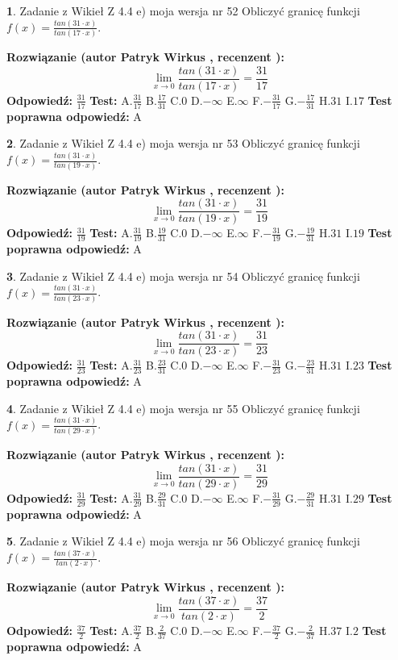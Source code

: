 \documentclass[12pt, a4paper]{article}
\theoremstyle{definition} %
\newtheorem{zad}{}
\newcommand{\zadStart}[1]{\begin{zad}#1\newline}
\newcommand{\zadStop}{\end{zad}}
\newcommand{\rozwStart}[2]{\noindent \textbf{Rozwiązanie (autor #1 , recenzent #2): }\newline}
\newcommand{\rozwStop}{\newline}
\newcommand{\odpStart}{\noindent \textbf{Odpowiedź:}\newline}
\newcommand{\odpStop}{\newline}
\newcommand{\testStart}{\noindent \textbf{Test:}\newline}
\newcommand{\testStop}{\newline}
\newcommand{\kluczStart}{\noindent \textbf{Test poprawna odpowiedź:}\newline}
\newcommand{\kluczStop}{\newline}
\begin{document}
\zadStart{Zadanie z Wikieł Z 4.4 e) moja wersja nr 52}
Obliczyć granicę funkcji $f(x)=\frac{tan(31\cdot x)}{tan(17\cdot x)}$.
\zadStop
\rozwStart{Patryk Wirkus}{}
$$\lim\limits_{x\to 0}\frac{tan(31\cdot x)}{tan(17\cdot x)}=
\frac{31}{17}$$
\rozwStop
\odpStart
$\frac{31}{17}$
\odpStop
\testStart
A.$\frac{31}{17}$
B.$\frac{17}{31}$
C.$0$
D.$-\infty$
E.$\infty$
F.$-\frac{31}{17}$
G.$-\frac{17}{31}$
H.$31$
I.$17$
\testStop
\kluczStart
A
\kluczStop



\zadStart{Zadanie z Wikieł Z 4.4 e) moja wersja nr 53}
Obliczyć granicę funkcji $f(x)=\frac{tan(31\cdot x)}{tan(19\cdot x)}$.
\zadStop
\rozwStart{Patryk Wirkus}{}
$$\lim\limits_{x\to 0}\frac{tan(31\cdot x)}{tan(19\cdot x)}=
\frac{31}{19}$$
\rozwStop
\odpStart
$\frac{31}{19}$
\odpStop
\testStart
A.$\frac{31}{19}$
B.$\frac{19}{31}$
C.$0$
D.$-\infty$
E.$\infty$
F.$-\frac{31}{19}$
G.$-\frac{19}{31}$
H.$31$
I.$19$
\testStop
\kluczStart
A
\kluczStop



\zadStart{Zadanie z Wikieł Z 4.4 e) moja wersja nr 54}
Obliczyć granicę funkcji $f(x)=\frac{tan(31\cdot x)}{tan(23\cdot x)}$.
\zadStop
\rozwStart{Patryk Wirkus}{}
$$\lim\limits_{x\to 0}\frac{tan(31\cdot x)}{tan(23\cdot x)}=
\frac{31}{23}$$
\rozwStop
\odpStart
$\frac{31}{23}$
\odpStop
\testStart
A.$\frac{31}{23}$
B.$\frac{23}{31}$
C.$0$
D.$-\infty$
E.$\infty$
F.$-\frac{31}{23}$
G.$-\frac{23}{31}$
H.$31$
I.$23$
\testStop
\kluczStart
A
\kluczStop



\zadStart{Zadanie z Wikieł Z 4.4 e) moja wersja nr 55}
Obliczyć granicę funkcji $f(x)=\frac{tan(31\cdot x)}{tan(29\cdot x)}$.
\zadStop
\rozwStart{Patryk Wirkus}{}
$$\lim\limits_{x\to 0}\frac{tan(31\cdot x)}{tan(29\cdot x)}=
\frac{31}{29}$$
\rozwStop
\odpStart
$\frac{31}{29}$
\odpStop
\testStart
A.$\frac{31}{29}$
B.$\frac{29}{31}$
C.$0$
D.$-\infty$
E.$\infty$
F.$-\frac{31}{29}$
G.$-\frac{29}{31}$
H.$31$
I.$29$
\testStop
\kluczStart
A
\kluczStop



\zadStart{Zadanie z Wikieł Z 4.4 e) moja wersja nr 56}
Obliczyć granicę funkcji $f(x)=\frac{tan(37\cdot x)}{tan(2\cdot x)}$.
\zadStop
\rozwStart{Patryk Wirkus}{}
$$\lim\limits_{x\to 0}\frac{tan(37\cdot x)}{tan(2\cdot x)}=
\frac{37}{2}$$
\rozwStop
\odpStart
$\frac{37}{2}$
\odpStop
\testStart
A.$\frac{37}{2}$
B.$\frac{2}{37}$
C.$0$
D.$-\infty$
E.$\infty$
F.$-\frac{37}{2}$
G.$-\frac{2}{37}$
H.$37$
I.$2$
\testStop
\kluczStart
A
\kluczStop
\end{document}
